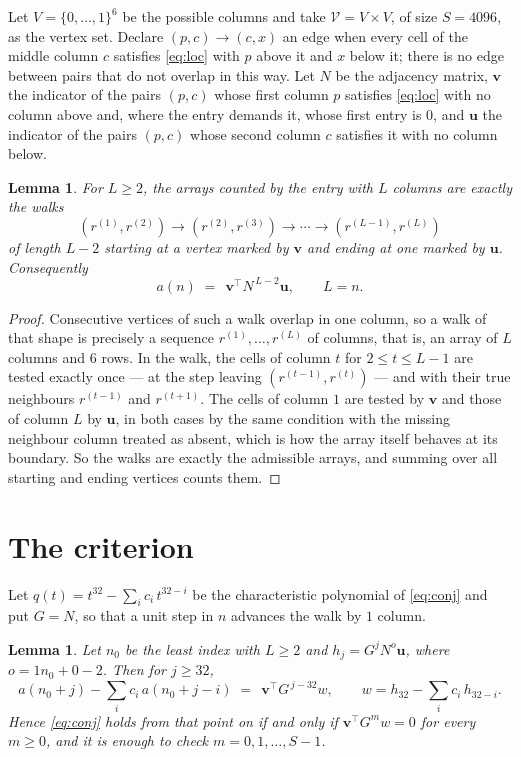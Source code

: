 \documentclass[11pt,a4paper]{article}
\theoremstyle{plain}
\newtheorem{lemma}[theorem]{Lemma}
\theoremstyle{definition}
\begin{document}
Let $V=\{0,\dots,1\}^{6}$ be the possible columns and take
$\mathcal V=V\times V$, of size $S=4096$, as the vertex set. Declare $(p,c)\to(c,x)$ an edge
when every cell of the middle column $c$ satisfies \eqref{eq:loc} with $p$ above it and $x$
below it; there is no edge between pairs that do not overlap in this way. Let $N$ be the
adjacency matrix, $\mathbf{v}$ the indicator of the pairs $(p,c)$ whose first column $p$
satisfies \eqref{eq:loc} with no column above and, where the entry demands it, whose first entry is $0$, and $\mathbf{u}$ the indicator of
the pairs $(p,c)$ whose second column $c$ satisfies it with no column below.

\begin{lemma}\label{lem:walk}
For $L\ge2$, the arrays counted by the entry with $L$ columns are exactly the walks
\[
(r^{(1)},r^{(2)})\to(r^{(2)},r^{(3)})\to\cdots\to(r^{(L-1)},r^{(L)})
\]
of length $L-2$ starting at a vertex marked by $\mathbf{v}$ and ending at one marked by
$\mathbf{u}$. Consequently
\[
a(n)\;=\;\,\mathbf{v}^{\!\top}N^{\,L-2}\mathbf{u},\qquad L=n .
\]
\end{lemma}

\begin{proof}
Consecutive vertices of such a walk overlap in one column, so a walk of that shape is
precisely a sequence $r^{(1)},\dots,r^{(L)}$ of columns, that is, an array of $L$ columns
and $6$ rows. In the walk, the cells of column $t$ for $2\le t\le L-1$ are tested
exactly once --- at the step leaving $(r^{(t-1)},r^{(t)})$ --- and with their true
neighbours $r^{(t-1)}$ and $r^{(t+1)}$. The cells of column $1$ are tested by
$\mathbf{v}$ and those of column $L$ by $\mathbf{u}$, in both cases by the same condition
with the missing neighbour column treated as absent, which is how the array itself behaves at
its boundary. So the walks are exactly the admissible arrays, and summing over all starting
and ending vertices counts them.
\end{proof}

\section{The criterion}

Let $q(t)=t^{32}-\sum_i c_i\,t^{32-i}$ be the characteristic polynomial of
\eqref{eq:conj} and put $G=N$, so that a unit step in $n$ advances the walk by
$1$ column.

\begin{lemma}\label{lem:crit}
Let $n_0$ be the least index with $L\ge2$ and $h_j=G^{j}N^{o}\mathbf{u}$, where
$o=1n_0+0-2$. Then for $j\ge32$,
\[
a(n_0+j)-\sum_i c_i\,a(n_0+j-i)\;=\;\,\mathbf{v}^{\!\top}G^{\,j-32}w,
\qquad w=h_{32}-\sum_i c_i\,h_{32-i} .
\]
Hence \eqref{eq:conj} holds from that point on if and only if
$\mathbf{v}^{\!\top}G^{m}w=0$ for every $m\ge0$, and it is enough to check
$m=0,1,\dots,S-1$.
\end{lemma}
\end{document}
